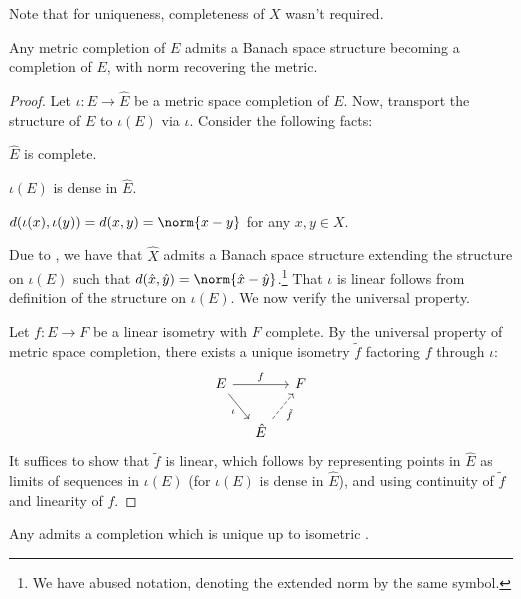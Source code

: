 	\begin{rmk}
		Note that for uniqueness, completeness of $X$ wasn't required.
	\end{rmk}
	
	
	\begin{prp}
		Any metric completion of $E$ admits a Banach space structure becoming a \NLS completion of $E$, with norm recovering the metric.
	\end{prp}
	
	\begin{proof}
		Let $\iota\colon E\to\hat E$ be a metric space completion of $E$. Now, transport the \NLS structure of $E$ to $\iota(E)$ via $\iota$. Consider the following facts:
		\begin{mylist}
			\item $\hat E$ is complete.
			\item $\iota(E)$ is dense in $\hat E$.
			\item $d(\iota(x), \iota(y)) = d(x, y) = \norm{x - y}$ for any $x, y\in X$.
		\end{mylist}
		Due to , we have that $\hat X$ admits a Banach space structure extending the \NLS structure on $\iota(E)$ such that $d(\hat x, \hat y) = \norm{\hat x - \hat y}$.\footnote{
			We have abused notation, denoting the extended norm by the same symbol.
		} That $\iota$ is linear follows from definition of the \NLS structure on $\iota(E)$. We now verify the universal property.
		
		Let $f\colon E\to F$ be a linear isometry with $F$ complete. By the universal property of metric space completion, there exists a unique isometry $\tilde f$ factoring $f$ through $\iota$:
		\[
		\begin{tikzcd}[column sep=small]
			E\ar[rr, "f"]\ar[dr, "\iota"'] & & F\\
			& \hat E\ar[ur, dashed, "\tilde f"'] &
		\end{tikzcd}
		\]
		It suffices to show that $\tilde f$ is linear, which follows by representing points in $\hat E$ as limits of sequences in $\iota(E)$ (for $\iota(E)$ is dense in $\hat E$), and using continuity of $\tilde f$ and linearity of $f$.
	\end{proof}
	
	
	\begin{cor}
		Any \NLS admits a completion which is unique up to isometric .
	\end{cor}
	
